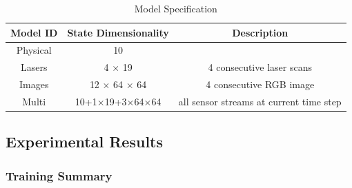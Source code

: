 \documentclass[../thesis.tex]{subfiles}
\begin{document}
\begin{table}[t]
    \vskip 0.1in
    \caption{Model Specification}
    \label{table:model-spec}
    \vskip 0.1in
    \centering
    \begin{small}
    \begin{tabular}{ccc}
    \toprule 
    \centering
    Model ID & State Dimensionality & Description \\ \midrule \midrule
    Physical & 10 & \\
    Lasers & 4 $\times$ 19 & 4 consecutive laser scans \\
    Images & 12 $\times$ 64 $\times$ 64 & 4 consecutive RGB image \\
    Multi  & 10+1$\times$19+3$\times$64$\times$64 & all sensor streams at current time step \\ \toprule
    \end{tabular}
    \end{small}
\end{table}


\subsection{Experimental Results} %
\subsubsection{Training Summary}
\end{document}
